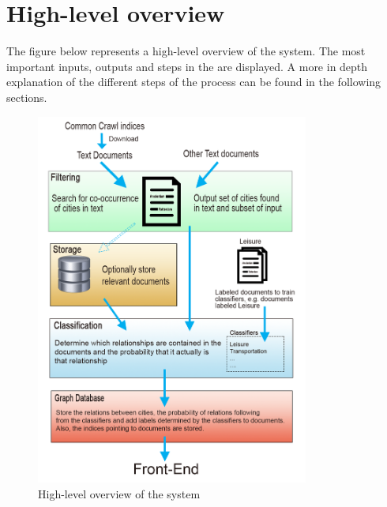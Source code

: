 \section{High-level overview}
The figure below represents a high-level overview of the system. The most important inputs, outputs and steps in the are displayed. A more in depth explanation of the different steps of the process can be found in the following sections.
\begin{figure}[H]
\centering
\includegraphics[width=0.8\textwidth]{System-overview-3}
\caption{High-level overview of the system}
\label{fig:overview}
\end{figure}